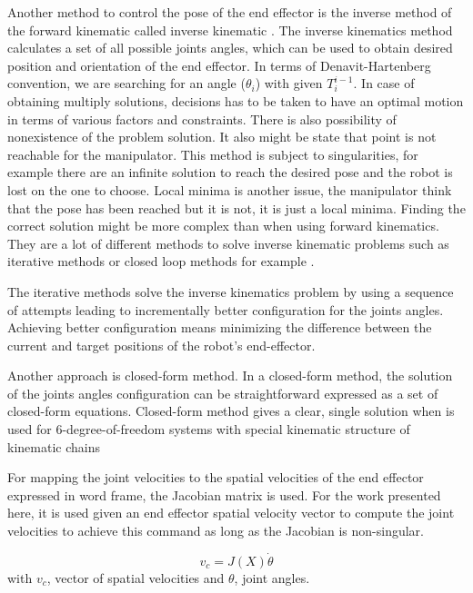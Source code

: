 Another method to control the pose of the end effector is the inverse method of the forward kinematic called inverse kinematic \cite{trove.nla.gov.au/work/27361264}. The inverse kinematics method calculates a set of all possible joints angles, which can be used to obtain desired position and orientation of the end effector. In terms of Denavit-Hartenberg convention, we are searching for an angle ($\theta _i$) with given $T_i^{i-1}$. In case of obtaining multiply solutions, decisions has to be taken to have an optimal motion in terms of various factors and constraints.
There is also possibility of nonexistence of the problem solution. It also might be state that point is not reachable for the manipulator. This method is subject to singularities, for example there are an infinite solution to reach the desired pose and the robot is lost on the one to choose. Local minima is another issue, the manipulator think that the pose has been reached but it is not, it is just a local minima. Finding the correct solution might be more complex than when using forward kinematics. They are a lot of different methods to solve inverse kinematic problems such as iterative methods or closed loop methods for example \cite{326569}.

The iterative methods solve the inverse kinematics problem by using a sequence of attempts leading to incrementally better configuration for the joints angles. Achieving better configuration means minimizing the difference between the current and target positions of the robot’s end-effector.

Another approach is closed-form method. In a closed-form method, the solution of the joints angles configuration can be straightforward expressed as a set of closed-form equations. Closed-form method gives a clear, single solution when is used for 6-degree-of-freedom systems with special kinematic structure
of kinematic chains

For mapping the joint velocities to the spatial velocities of the end effector expressed in word frame, the Jacobian matrix is used. For the work presented here, it is used given an end effector spatial velocity vector to compute the joint velocities to achieve this command as long as the Jacobian is non-singular.

\begin{equation}
    v_c = J(X) \Dot{\theta }
\end{equation}
with $v_c$, vector of spatial velocities and $\theta$, joint angles. 
\newpage
